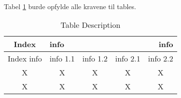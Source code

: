 \documentclass[../template/template.tex]{subfiles}
\begin{document}
Tabel \ref{table:test:table} burde opfylde alle kravene til tables.
\begin{table}[h]
    \begin{center}
        \begin{tabular}{|c|c|c|c|c|}
    
            \hline
            Index & \multicolumn{2}{l|}{info} & \multicolumn{2}{r|}{info} \\
            \hline
            Index info & info 1.1 & info 1.2 & info 2.1 & info 2.2 \\
            \hline
            X & X & X & X & X \\
            \hline
            X & X & X & X & X \\
            \hline
        \end{tabular}
    \end{center}
\caption{\label{table:test:table}Table Description}
\end{table}
\end{document}
